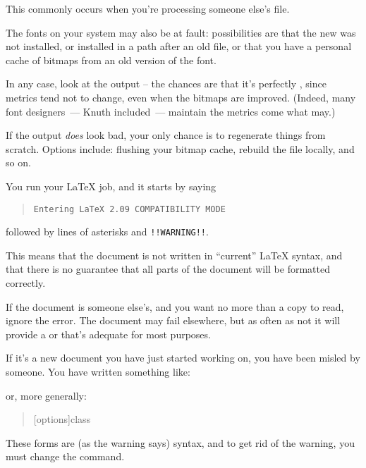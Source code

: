 {This commonly occurs when you're processing someone else's 
file.

The fonts on your system may also be at fault: possibilities are that
the new  was not installed, or installed in a path after an
old  file, or that you have a personal cache of bitmaps from
an old version of the font.

In any case, look at the output -- the chances are that it's perfectly
, since metrics tend not to change, even when the bitmaps are
improved.  (Indeed, many font designers~--- Knuth included~---
maintain the metrics come what may.)

If the output \emph{does} look bad, your only chance is to regenerate
things from scratch.  Options include: flushing your bitmap cache,
rebuild the  file locally, and so on.


You run your \LaTeX{} job, and it starts by saying
\begin{quote}
\begin{verbatim}
Entering LaTeX 2.09 COMPATIBILITY MODE
\end{verbatim}
\end{quote}
followed by lines of asterisks and \texttt{!!WARNING!!}.

This means that the document is not written in ``current'' \LaTeX{}
syntax, and that there is no guarantee that all parts of the document
will be formatted correctly.

If the document is someone else's, and you want no more than a copy to
read, ignore the error.  The document may fail elsewhere, but as often
as not it will provide a  or  that's
adequate for most purposes.

If it's a new document you have just started working on, you have been
misled by someone.  You have written something like:
\begin{quote}
\end{quote}
or, more generally:
\begin{quote}
  [options]{class}
\end{quote}
These forms are (as the warning says) \LaTeXo{} syntax, and to get rid
of the warning, you must change the command.

}

